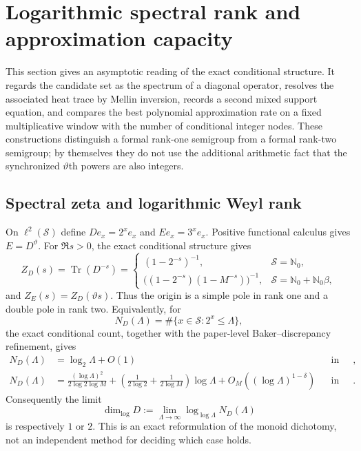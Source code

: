 \documentclass[11pt,oneside]{article}
\theoremstyle{definition}
\theoremstyle{remark}
\newcommand{\Nzero}{\mathbb N_0}
\newcommand{\thetaq}{\vartheta}
\newcommand{\Sol}{\mathcal S}
\begin{document}
\section{Logarithmic spectral rank and approximation capacity}
\label{sec:spectral-capacity}

This section gives an asymptotic reading of the exact conditional structure.  It regards the
candidate set as the spectrum of a diagonal operator, resolves the associated
heat trace by Mellin inversion, records a second mixed support equation, and compares the
best polynomial approximation rate on a fixed multiplicative window with the number of
conditional integer nodes.  These constructions distinguish a formal rank-one semigroup from
a formal rank-two semigroup; by themselves they do not use the additional arithmetic fact
that the synchronized $\thetaq$th powers are also integers.

\subsection{Spectral zeta and logarithmic Weyl rank}
\label{spec:spectral}

On $\ell^2(\Sol)$ define $De_x=2^x e_x$ and $Ee_x=3^x e_x$.  Positive functional calculus
gives $E=D^{\thetaq}$.  For $\Re s>0$, the exact conditional structure gives
\begin{equation}
 Z_D(s)=\operatorname{Tr}(D^{-s})=
 \begin{cases}
 (1-2^{-s})^{-1},&\Sol=\Nzero,\\[0.3em]
 \bigl((1-2^{-s})(1-M^{-s})\bigr)^{-1},
   &\Sol=\Nzero+\Nzero\beta,
 \end{cases}
 \label{spec:eq-spectral-zeta}
\end{equation}
and $Z_E(s)=Z_D(\thetaq s)$.  Thus the origin is a simple pole in rank one and a double pole
in rank two.  Equivalently, for
\begin{equation}
 N_D(\Lambda)=\#\{x\in\Sol:2^x\le\Lambda\},
\end{equation}
the exact conditional count, together with the paper-level Baker--discrepancy refinement,
gives
\begin{align}
 N_D(\Lambda)&=\log_2\Lambda+O(1)
 &&\text{in rank one},\label{spec:eq-weyl-one}\\
 N_D(\Lambda)&=\frac{(\log\Lambda)^2}{2\log2\log M}
 +\left(\frac1{2\log2}+\frac1{2\log M}\right)\log\Lambda
 +O_M((\log\Lambda)^{1-\delta})
 &&\text{in rank two}.\label{spec:eq-weyl-two}
\end{align}
Consequently the limit
\begin{equation}
 \dim_{\log}D:=\lim_{\Lambda\to\infty}
 \log_{\log\Lambda}N_D(\Lambda)
\end{equation}
is respectively $1$ or $2$.  This is an exact reformulation of the monoid dichotomy, not an
independent method for deciding which case holds.
\end{document}
